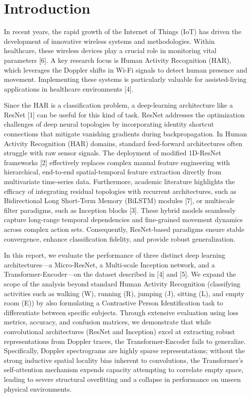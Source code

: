 \section{Introduction}
\label{sec:introduction}

In recent years, the rapid growth of the Internet of Things (IoT) has driven the development of innovative wireless systems and methodologies. Within healthcare, these wireless devices play a crucial role in monitoring vital parameters [6]. A key research focus is Human Activity Recognition (HAR), which leverages the Doppler shifts in Wi-Fi signals to detect human presence and movement. Implementing these systems is particularly valuable for assisted-living applications in healthcare environments [4].

Since the HAR is a classification problem, a deep-learning architecture like a ResNet [1] can be useful for this kind of task. ResNet addresses the optimization challenges of deep neural topologies by incorporating identity shortcut connections that mitigate vanishing gradients during backpropagation. In Human Activity Recognition (HAR) domains, standard feed-forward architectures often struggle with raw sensor signals. The deployment of modified 1D-ResNet frameworks [2] effectively replaces complex manual feature engineering with hierarchical, end-to-end spatial-temporal feature extraction directly from multivariate time-series data. Furthermore, academic literature highlights the efficacy of integrating residual topologies with recurrent architectures, such as Bidirectional Long Short-Term Memory (BiLSTM) modules [7], or multiscale filter paradigms, such as Inception blocks [3]. These hybrid models seamlessly capture long-range temporal dependencies and fine-grained movement dynamics across complex action sets. Consequently, ResNet-based paradigms ensure stable convergence, enhance classification fidelity, and provide robust generalization.

In this report, we evaluate the performance of three distinct deep learning architectures---a Micro-ResNet, a Multi-scale Inception network, and a Transformer-Encoder---on the dataset described in [4] and [5]. We expand the scope of the analysis beyond standard Human Activity Recognition (classifying activities such as walking (W), running (R), jumping (J), sitting (L), and empty room (E)) by also formulating a Contrastive Person Identification task to differentiate between specific subjects. Through extensive evaluation using loss metrics, accuracy, and confusion matrices, we demonstrate that while convolutional architectures (ResNet and Inception) excel at extracting robust representations from Doppler traces, the Transformer-Encoder fails to generalize. Specifically, Doppler spectrograms are highly sparse representations; without the strong inductive spatial locality bias inherent to convolutions, the Transformer's self-attention mechanism expends capacity attempting to correlate empty space, leading to severe structural overfitting and a collapse in performance on unseen physical environments.

